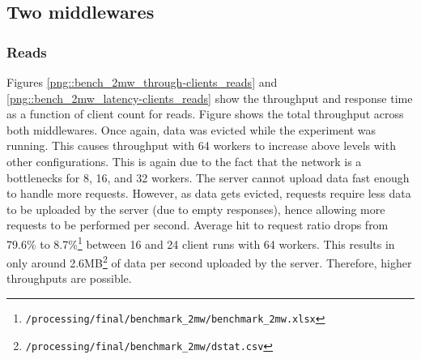 \documentclass[11pt,a4paper]{article}
\begin{document}
\subsection{Two middlewares}
\subsubsection{Reads}
Figures \ref{png::bench_2mw_through-clients_reads} and \ref{png::bench_2mw_latency-clients_reads} show the throughput and response time as a function of client count for reads. Figure shows the total throughput across both middlewares.
Once again, data was evicted while the experiment was running. This causes throughput with 64 workers to increase above levels with other configurations. This is again due to the fact that the network is a bottlenecks for 8, 16, and 32 workers. The server cannot upload data fast enough to handle more requests. However, as data gets evicted, requests require less data to be uploaded by the server (due to empty responses), hence allowing more requests to be performed per second. Average hit to request ratio drops from 79.6\% to 8.7\%\footnote{\texttt{/processing/final/benchmark_2mw/benchmark_2mw.xlsx}} between 16 and 24 client runs with 64 workers. This results in only around 2.6MB\footnote{\texttt{/processing/final/benchmark_2mw/dstat.csv}} of data per second uploaded by the server. Therefore, higher throughputs are possible.
\end{document}
